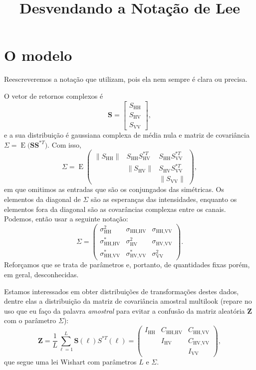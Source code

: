 \documentclass[12pt]{article}
\title{Desvendando a Notação de Lee}
\author{}
\date{}
\newcommand{\E}{\operatorname{E}}
\begin{document}
\maketitle

\section{O modelo}
Reescreveremos a notação que \citet{lee} utilizam, pois ela nem sempre é clara ou precisa.

O vetor de retornos complexos é
$$
\bm S =
	\begin{bmatrix}
	S_{\text{HH}}\\
	S_{\text{HV}}\\
	S_{\text{VV}}
	\end{bmatrix},
$$
e a sua distribuição é gaussiana complexa de média nula e matriz de covariância $\Sigma=\E\big(\bm S \bm S^{*T}\big)$.
Com isso,
$$
\Sigma= \E\begin{pmatrix}
\|S_{\text{HH}}\|	& S_{\text{HH}} S_{\text{HV}}^{*T}	& S_{\text{HH}} S_{\text{VV}}^{*T}\\
				& \|S_{\text{HV}}\|					& S_{\text{HV}} S_{\text{VV}}^{*T}\\
				&										& \|S_{\text{VV}}\|
\end{pmatrix},
$$
em que omitimos as entradas que são os conjungados das simétricas.
Os elementos da diagonal de $\Sigma$ são as esperanças das intensidades,
enquanto os elementos fora da diagonal são as covarâncias complexas entre os canais.
Podemos, então usar a seguinte notação:
$$
\Sigma = \begin{pmatrix}
\sigma_{\text{HH}}^2		& \sigma_{\text{HH,HV}}		& \sigma_{\text{HH,VV}} \\
\sigma_{\text{HH,HV}}^* 	& \sigma_{\text{HV}}^2		& \sigma_{\text{HV,VV}} \\
\sigma_{\text{HH,VV}}^*		& \sigma_{\text{HV,VV}}^*	& \sigma_{\text{VV}}^2
\end{pmatrix}.
$$
Reforçamos que se trata de parâmetros e, portanto, de quantidades fixas porém, em geral, desconhecidas.

Estamos interessados em obter distribuições de transformações destes dados, dentre elas a distribuição da matriz de covariância amostral multilook (repare no uso que eu faço da palavra \textit{amostral} para evitar a confusão da matriz aleatória $\bm Z$ com o parâmetro $\Sigma$):
$$
\bm Z = \frac1L \sum_{\ell=1}^L \bm S(\ell) S^{*T}(\ell) = 
\begin{pmatrix}
I_{\text{HH}}	& C_{\text{HH,HV}}	& C_{\text{HH,VV}} \\
				& I_{\text{HV}}		& C_{\text{HV,VV}} \\
				&					& I_{\text{VV}} 
\end{pmatrix},
$$
que segue uma lei Wishart com parâmetros $L$ e $\Sigma$.
\end{document}
